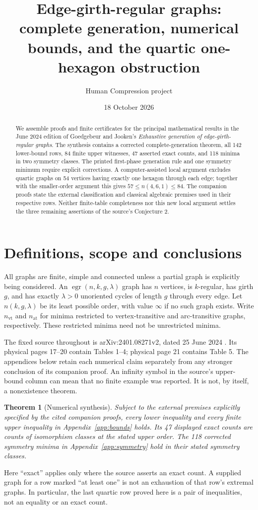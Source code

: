 \documentclass[11pt,a4paper]{article}
\title{Edge-girth-regular graphs: complete generation, numerical bounds,\newline
and the quartic one-hexagon obstruction}
\author{Human Compression project}
\date{18 October 2026}
\newtheorem{theorem}{Theorem}
\newcommand{\egr}{\operatorname{egr}}
\newcommand{\vt}{\mathrm{vt}}
\newcommand{\at}{\mathrm{at}}
\begin{document}
\maketitle
\begin{abstract}
We assemble proofs and finite certificates for the principal mathematical
results in the June 2024 edition of Goedgebeur and Jooken's
\emph{Exhaustive generation of edge-girth-regular graphs}. The synthesis
contains a corrected complete-generation theorem, all 142 lower-bound
rows, 84 finite upper witnesses, 47 asserted exact counts, and 118 minima
in two symmetry classes. The printed first-phase generation rule and one
symmetry minimum require explicit corrections. A computer-assisted local
argument excludes quartic graphs on 54 vertices having exactly one hexagon
through each edge; together with the smaller-order argument this gives
$57\le n(4,6,1)\le84$. The companion proofs state the external
classification and classical algebraic premises used in their respective
rows. Neither finite-table completeness nor this new local argument
settles the three remaining assertions of the source's Conjecture 2.
\end{abstract}

\section{Definitions, scope and conclusions}
All graphs are finite, simple and connected unless a partial graph is
explicitly being considered. An $\egr(n,k,g,\lambda)$ graph has $n$
vertices, is $k$-regular, has girth $g$, and has exactly $\lambda>0$
unoriented cycles of length $g$ through every edge. Let $n(k,g,\lambda)$
be its least possible order, with value $\infty$ if no such graph exists.
Write $n_{\vt}$ and $n_{\at}$ for minima restricted to vertex-transitive
and arc-transitive graphs, respectively. These restricted minima need not
be unrestricted minima.

The fixed source throughout is arXiv:2401.08271v2, dated 25 June 2024
\cite{source}. Its physical pages 17--20 contain Tables 1--4; physical
page 21 contains Table 5. The appendices below retain each numerical
claim separately from any stronger conclusion of its companion proof.
An infinity symbol in the source's upper-bound column can mean that no
finite example was reported. It is not, by itself, a nonexistence theorem.

\begin{theorem}[Numerical synthesis]\label{thm:numerical}
Subject to the external premises explicitly specified by the cited
companion proofs, every lower inequality and every finite upper
inequality in Appendix~\ref{app:bounds} holds. Its 47 displayed exact
counts are counts of isomorphism classes at the stated upper order.
The 118 corrected symmetry minima in Appendix~\ref{app:symmetry} hold
in their stated symmetry classes.
\end{theorem}
Here ``exact'' applies only where the source asserts an exact count.
A supplied graph for a row marked ``at least one'' is not an exhaustion
of that row's extremal graphs. In particular, the last quartic row proved
here is a pair of inequalities, not an equality or an exact count.
\end{document}
